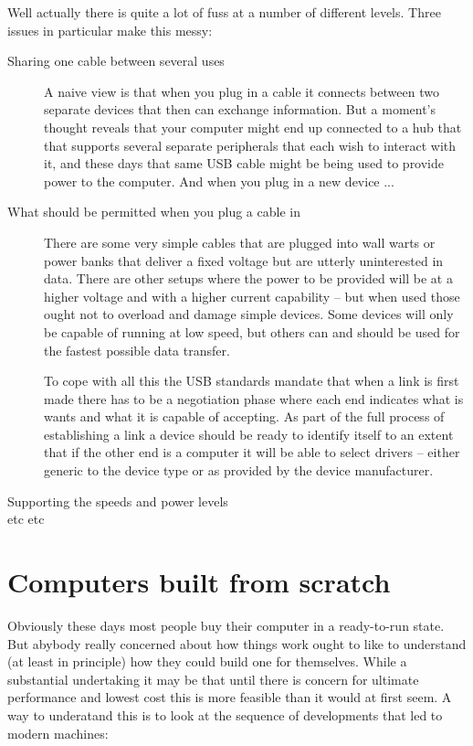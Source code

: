 Well actually there is quite a lot of fuss at a number of different
levels. Three issues in particular make this messy:
\begin{description}
\item[Sharing one cable between several uses]
A naive view is that when you plug in a cable it connects between two
separate devices that then can exchange information. But a moment's
thought reveals that your computer might end up connected to a hub that
that supports several separate peripherals that each wish to interact with
it, and these days that same USB cable might be being used to provide
power to the computer. And when you plug in a new device ...

\item[What should be permitted when you plug a cable in]
There are some very simple cables that are plugged into
wall warts or power banks that deliver a fixed voltage but are
utterly uninterested in data. There are other setups where the power
to be provided will be at a higher voltage and with a higher current
capability -- but when used those ought not to overload and damage
simple devices. Some devices will only be capable of running at low
speed, but others can and should be used for the fastest possible
data transfer.

To cope with all this the USB standards mandate that when a link is first
made there has to be a negotiation phase where each end indicates
what is wants and what it is capable of accepting. As part of the
full process of establishing a link a device should be ready to identify
itself to an extent that if the other end is a computer it will be able
to select drivers -- either generic to the device type or as provided
by the device manufacturer.

\item[Supporting the speeds and power levels]
\item[etc etc]
\end{description}

\section{Computers built from scratch}
Obviously these days most people buy their computer in a ready-to-run state.
But abybody really concerned about how things work ought to like to
understand (at least in principle) how they could build one for themselves.
While a substantial undertaking it may be that until there is concern for
ultimate performance and lowest cost this is more feasible than it would at
first seem. A way to underatand this is to look at the sequence of
developments that led to modern machines:

